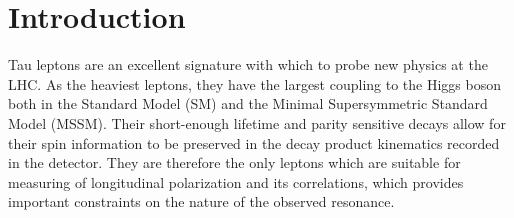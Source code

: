 \documentclass[12pt]{article}
\begin{document}
\section{Introduction}



Tau leptons are an excellent signature with which to
probe new physics at the LHC. As the heaviest leptons, they
have the largest coupling to the Higgs boson both
in the Standard Model (SM) and the Minimal
Supersymmetric Standard Model (MSSM). Their short-enough lifetime and parity sensitive decays
allow for their spin information to be preserved in the decay product 
kinematics recorded in the detector. They are therefore the only leptons which are suitable
for measuring of longitudinal polarization and its correlations,
which provides important constraints on the nature of the observed resonance.
\end{document}
